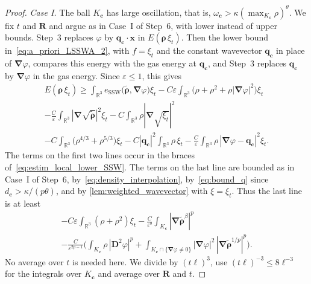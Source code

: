 \documentclass[final,reqno]{amsart}
\theoremstyle{remark}
\renewcommand{\le}{\leqslant}
\renewcommand{\ge}{\geqslant}
\renewcommand{\epsilon}{\varepsilon}
\newcommand{\wt}[1]{\widetilde{#1}}
\newcommand{\RR}{\mathbb{R}}
\newcommand{\SSW}{\mathrm{SSW}}
\newcommand{\grad}{\bm{\nabla}}
\begin{document}
\begin{proof}
\emph{Case I.} The ball $K_{\mathbf{c}}$ has large oscillation, that is, $\omega_{\mathbf{c}}>\kappa(\max_{K_{\mathbf{c}}}\rho)^\theta$. We fix $t$ and $\mathbf{R}$ and argue as in Case~I of Step~6, with lower instead of upper bounds. Step~3 replaces $\varphi$ by $\mathbf{q}_{\mathbf{c}}\cdot\mathbf{x}$ in $E(\bm{\rho}\,\xi_t)$. Then the lower bound in~\cref{eq:a_priori_LSSWA_2}, with $f=\xi_t$ and the constant wavevector $\mathbf{q}_{\mathbf{c}}$ in place of $\grad\varphi$, compares this energy with the gas energy at $\mathbf{q}_{\mathbf{c}}$, and Step~3 replaces $\mathbf{q}_{\mathbf{c}}$ by $\grad\varphi$ in the gas energy. Since $\epsilon\le1$, this gives
\begin{multline*}
E(\bm{\rho}\,\xi_t)\ge\int_{\RR^3}e_\SSW\big(\wt{\bm{\rho}},\grad\varphi\big)\xi_t-C\epsilon\int_{\RR^3}\big(\rho+\rho^2+\rho|\grad\varphi|^2\big)\xi_t\\
-\frac C\epsilon\int_{\RR^3}|\grad\sqrt{\wt{\bm{\rho}}}|^2\xi_t-C\int_{\RR^3}\rho|\grad\sqrt{\xi_t}|^2\\
-C\int_{\RR^3}\big(\rho^{4/3}+\rho^{5/3}\big)\xi_t-C|\mathbf{q}_{\mathbf{c}}|^2\int_{\RR^3}\rho\,\xi_t-\frac C\epsilon\int_{\RR^3}\rho\,|\grad\varphi-\mathbf{q}_{\mathbf{c}}|^2\xi_t.
\end{multline*}
The terms on the first two lines occur in the braces of~\cref{eq:estim_local_lower_SSW}. The terms on the last line are bounded as in Case~I of Step~6, by~\cref{eq:density_interpolation}, by~\cref{eq:bound_q} since $d_{\mathbf{c}}>\kappa/(p\theta)$, and by \cref{lem:weighted_wavevector} with $\xi=\xi_t$. Thus the last line is at least
\begin{multline*}
-C\epsilon\int_{\RR^3}(\rho+\rho^2)\xi_t-\frac{C}{\epsilon^b}\int_{K_{\mathbf{c}}}|\grad\wt{\bm{\rho}}^\beta|^p\\
-\frac{C}{\epsilon^{2p-1}}\bigg(\int_{K_{\mathbf{c}}}\rho\,|\mathbf{D}^2\varphi|^p+\int_{K_{\mathbf{c}}\cap\{\grad\varphi\ne0\}}|\grad\varphi|^2\,|\grad\wt{\bm{\rho}}^{1/p}|^p\bigg).
\end{multline*}
No average over $t$ is needed here. We divide by $(t\ell)^3$, use $(t\ell)^{-3}\le8\ell^{-3}$ for the integrals over $K_{\mathbf{c}}$ and average over $\mathbf{R}$ and $t$.


\end{proof}
\end{document}
